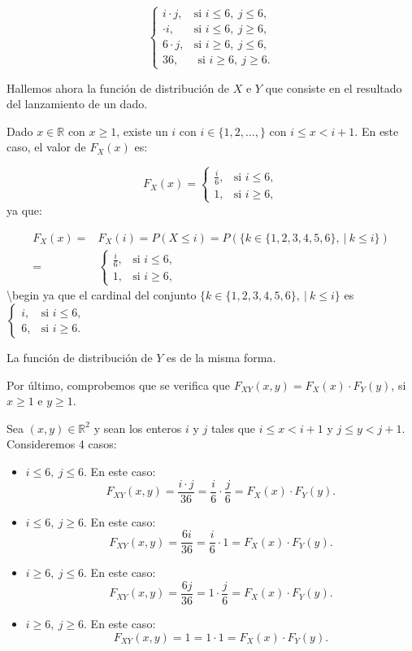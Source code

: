 \documentclass[]{book}
\begin{document}
\[
\begin{cases}
i\cdot j, & \mbox{si }i\leq 6, \ j\leq 6, \\
\cdot  i, & \mbox{si }i\leq 6,\ j\geq 6,\\
6\cdot j, & \mbox{si }i\geq 6,\ j\leq 6,\\
36, & \mbox{ si }i\geq 6,\ j\geq 6.
\end{cases}
\]

Hallemos ahora la función de distribución de \(X\) e \(Y\) que consiste en el resultado del lanzamiento de un dado.

Dado \(x\in\mathbb{R}\) con \(x\geq 1\), existe un \(i\) con \(i\in\{1,2,\ldots,\}\) con \(i\leq x <i+1\). En este caso, el valor de \(F_X(x)\) es:

\[
F_X(x)=\begin{cases}
\frac{i}{6}, &\mbox{si }i\leq 6,\\
1, & \mbox{si }i\geq 6,
\end{cases}
\]
ya que:

\[
\begin{array}{rl}
F_X(x) = & F_X(i)=P(X\leq i)=P(\{k\in\{1,2,3,4,5,6\},\ |\ k\leq i\})
\\ = & 
\begin{cases}
\frac{i}{6}, &\mbox{si }i\leq 6,\\
1, & \mbox{si }i\geq 6,
\end{cases}
\end{array}
\]
\textbackslash{}begin
ya que el cardinal del conjunto \(\{k\in\{1,2,3,4,5,6\},\ |\ k\leq i\}\) es \(\begin{cases} i, &\mbox{si }i\leq 6,\\ 6, & \mbox{si }i\geq 6. \end{cases}\)

La función de distribución de \(Y\) es de la misma forma.

Por último, comprobemos que se verifica que \(F_{XY}(x,y)=F_X(x)\cdot F_Y(y)\), si \(x\geq 1\) e \(y\geq 1\).

Sea \((x,y)\in\mathbb{R}^2\) y sean los enteros \(i\) y \(j\) tales que \(i\leq x<i+1\) y \(j\leq y<j+1\). Consideremos 4 casos:

\begin{itemize}
\item
  \(i\leq 6, \ j\leq 6\). En este caso:
  \[
  F_{XY}(x,y)=\frac{i\cdot j}{36}=\frac{i}{6}\cdot \frac{j}{6}=F_X(x)\cdot F_Y(y).
  \]
\item
  \(i\leq 6,\ j\geq 6\). En este caso:
  \[
  F_{XY}(x,y)=\frac{6i}{36}=\frac{i}{6}\cdot 1=F_X(x)\cdot F_Y(y).
  \]
\item
  \(i\geq 6,\ j\leq 6\). En este caso:
  \[
  F_{XY}(x,y)=\frac{6j}{36}=1\cdot \frac{j}{6}=F_X(x)\cdot F_Y(y).
  \]
\item
  \(i\geq 6,\ j\geq 6\). En este caso:
  \[
  F_{XY}(x,y)=1=1\cdot 1=F_X(x)\cdot F_Y(y).
  \]
\end{itemize}
\end{document}
